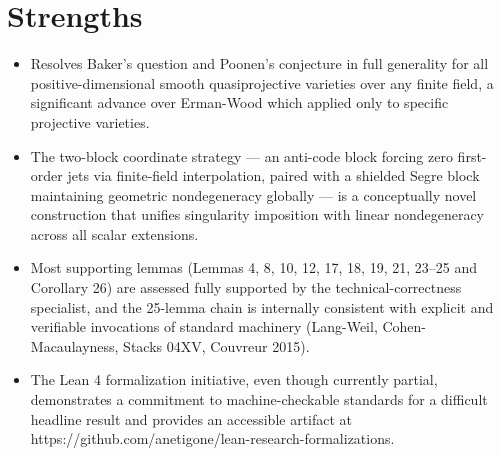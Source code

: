 \documentclass[11pt]{article}
\begin{document}
\section*{Strengths}
\begin{itemize}[leftmargin=*]
  \item Resolves Baker's question and Poonen's conjecture in full generality for all positive-dimensional smooth quasiprojective varieties over any finite field, a significant advance over Erman-Wood which applied only to specific projective varieties.
  \item The two-block coordinate strategy --- an anti-code block forcing zero first-order jets via finite-field interpolation, paired with a shielded Segre block maintaining geometric nondegeneracy globally --- is a conceptually novel construction that unifies singularity imposition with linear nondegeneracy across all scalar extensions.
  \item Most supporting lemmas (Lemmas 4, 8, 10, 12, 17, 18, 19, 21, 23--25 and Corollary 26) are assessed fully supported by the technical-correctness specialist, and the 25-lemma chain is internally consistent with explicit and verifiable invocations of standard machinery (Lang-Weil, Cohen-Macaulayness, Stacks 04XV, Couvreur 2015).
  \item The Lean 4 formalization initiative, even though currently partial, demonstrates a commitment to machine-checkable standards for a difficult headline result and provides an accessible artifact at https://github.com/anetigone/lean-research-formalizations.
\end{itemize}
\end{document}
